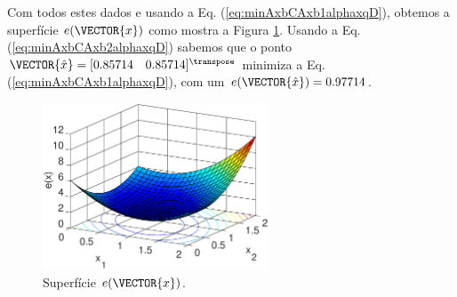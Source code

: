 \begin{SolutionT}
\label{ex:minAxbCAxbplusalphaxqD:sol1}
Com todos estes dados e usando a Eq. (\ref{eq:minAxbCAxb1alphaxqD}),
obtemos a superfície $e(\VECTOR{x})$ como mostra a Figura \ref{fig:ex:minAxbCAxb1alphaxqD:a}.
Usando a Eq. (\ref{eq:minAxbCAxb2alphaxqD}) sabemos que o ponto $\VECTOR{\hat{x}}=[0.85714\quad 0.85714]^{\transpose}$
minimiza a Eq. (\ref{eq:minAxbCAxb1alphaxqD}), com um $e(\VECTOR{\hat{x}})=0.97714$.

\begin{figure}[h!]
         \centering
         \includegraphics[width=0.6\textwidth]{chapters/minimization-fx/mfiles/axxq1/surfcex.eps}
         \caption{Superfície $e(\VECTOR{x})$. }
         \label{fig:ex:minAxbCAxb1alphaxqD:a}
\end{figure}

\end{SolutionT}

